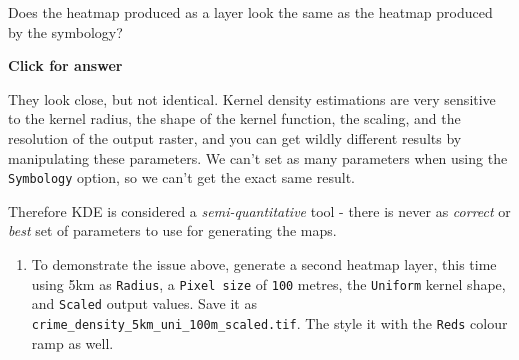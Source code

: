 \documentclass[
  letterpaper,
  DIV=11,
  numbers=noendperiod]{scrreprt}
\providecommand{\tightlist}{%
  \setlength{\itemsep}{0pt}\setlength{\parskip}{0pt}}\usepackage{longtable,booktabs,array}
\begin{document}
\begin{tcolorbox}[enhanced jigsaw, coltitle=black, toprule=.15mm, breakable, opacitybacktitle=0.6, left=2mm, colback=white, leftrule=.75mm, rightrule=.15mm, colbacktitle=quarto-callout-important-color!10!white, toptitle=1mm, titlerule=0mm, colframe=quarto-callout-important-color-frame, arc=.35mm, bottomtitle=1mm, opacityback=0, bottomrule=.15mm, title=\textcolor{quarto-callout-important-color}{\faExclamation}\hspace{0.5em}{Stop and Think}]

Does the heatmap produced as a layer look the same as the heatmap
produced by the symbology?

\end{tcolorbox}

\begin{tcolorbox}[enhanced jigsaw, toprule=.15mm, breakable, left=2mm, colframe=quarto-callout-important-color-frame, colback=white, arc=.35mm, leftrule=.75mm, opacityback=0, rightrule=.15mm, bottomrule=.15mm]

\vspace{-3mm}\textbf{Click for answer}\vspace{3mm}

They look close, but not identical. Kernel density estimations are very
sensitive to the kernel radius, the shape of the kernel function, the
scaling, and the resolution of the output raster, and you can get wildly
different results by manipulating these parameters. We can't set as many
parameters when using the \texttt{Symbology} option, so we can't get the
exact same result.

Therefore KDE is considered a \emph{semi-quantitative} tool - there is
never as \emph{correct} or \emph{best} set of parameters to use for
generating the maps.

\end{tcolorbox}

\begin{enumerate}
\def\labelenumi{(\arabic{enumi})}
\setcounter{enumi}{335}
\tightlist
\item
  To demonstrate the issue above, generate a second heatmap layer, this
  time using 5km as \texttt{Radius}, a \texttt{Pixel\ size} of
  \texttt{100} metres, the \texttt{Uniform} kernel shape, and
  \texttt{Scaled} output values. Save it as
  \texttt{crime\_density\_5km\_uni\_100m\_scaled.tif}. The style it with
  the \texttt{Reds} colour ramp as well.
\end{enumerate}
\end{document}
